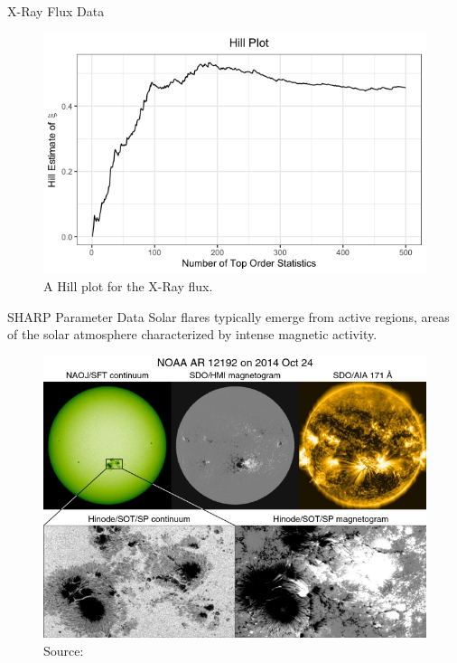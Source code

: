 \documentclass{beamer}
\begin{document}
\begin{frame}{X-Ray Flux Data}
    \begin{figure}
        \centering
        \includegraphics[scale=0.5]{hill_plot.png}
        \caption{A Hill plot for the X-Ray flux.}
        \label{fig:hill_plot}
    \end{figure}
\end{frame}

\begin{frame}{SHARP Parameter Data}
    Solar flares typically emerge from active regions, areas of the solar atmosphere  characterized by intense magnetic activity.
    \begin{figure}
        \centering
        \includegraphics[scale=0.33]{active_region.png}
        \caption{Source: \cite{toriumi2019flar}}
        \label{fig:active_region}
    \end{figure}
\end{frame} 
\end{document}
